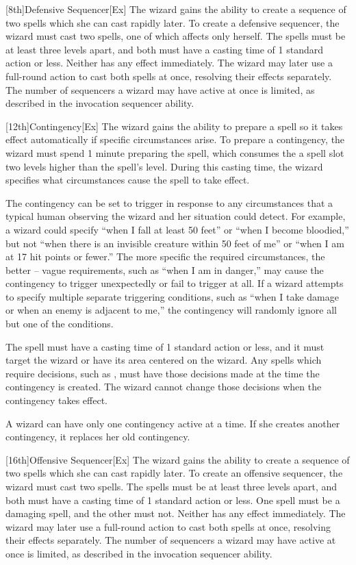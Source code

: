 [8th]{Defensive Sequencer}[Ex]
The wizard gains the ability to create a sequence of two spells which she can cast rapidly later.
To create a defensive sequencer, the wizard must cast two spells, one of which affects only herself.
The spells must be at least three levels apart, and both must have a casting time of 1 standard action or less.
Neither has any effect immediately.
The wizard may later use a full-round action to cast both spells at once, resolving their effects separately.
The number of sequencers a wizard may have active at once is limited, as described in the invocation sequencer ability.

[12th]{Contingency}[Ex]
The wizard gains the ability to prepare a spell so it takes effect automatically if specific circumstances arise.
To prepare a contingency, the wizard must spend 1 minute preparing the spell, which consumes the a spell slot two levels higher than the spell's level.
During this casting time, the wizard specifies what circumstances cause the spell to take effect.

The contingency can be set to trigger in response to any circumstances that a typical human observing the wizard and her situation could detect.
For example, a wizard could specify ``when I fall at least 50 feet'' or ``when I become bloodied,'' but not ``when there is an invisible creature within 50 feet of me'' or ``when I am at 17 hit points or fewer.'' The more specific the required circumstances, the better -- vague requirements, such as ``when I am in danger,'' may cause the contingency to trigger unexpectedly or fail to trigger at all.
If a wizard attempts to specify multiple separate triggering conditions, such as ``when I take damage or when an enemy is adjacent to me,'' the contingency will randomly ignore all but one of the conditions.

The spell must have a casting time of 1 standard action or less, and it must target the wizard or have its area centered on the wizard.
Any spells which require decisions, such as , must have those decisions made at the time the contingency is created.
The wizard cannot change those decisions when the contingency takes effect.

A wizard can have only one contingency active at a time.
If she creates another contingency, it replaces her old contingency.

[16th]{Offensive Sequencer}[Ex]
The wizard gains the ability to create a sequence of two spells which she can cast rapidly later.
To create an offensive sequencer, the wizard must cast two spells.
The spells must be at least three levels apart, and both must have a casting time of 1 standard action or less.
One spell must be a damaging spell, and the other must not.
Neither has any effect immediately.
The wizard may later use a full-round action to cast both spells at once, resolving their effects separately.
The number of sequencers a wizard may have active at once is limited, as described in the invocation sequencer ability.

